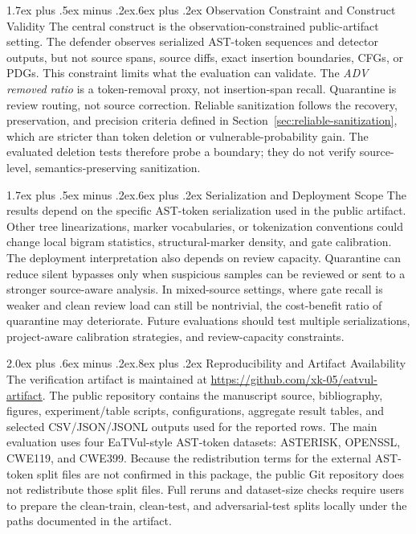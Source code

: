 \documentclass[letterpaper,twocolumn,10pt,twoside]{article}
\makeatletter
\renewcommand\section{\@startsection{section}{1}{\z@}%
  {2.0ex plus .6ex minus .2ex}{.8ex plus .2ex}%
  {\normalfont\large\bfseries}}
\renewcommand\subsection{\@startsection{subsection}{2}{\z@}%
  {1.7ex plus .5ex minus .2ex}{.6ex plus .2ex}%
  {\normalfont\normalsize\bfseries}}
\newcommand{\dataset}[1]{\textsc{#1}}
\makeatother
\begin{document}
\subsection{Observation Constraint and Construct Validity}
The central construct is the observation-constrained public-artifact setting. The defender observes serialized AST-token sequences and detector outputs, but not source spans, source diffs, exact insertion boundaries, CFGs, or PDGs. This constraint limits what the evaluation can validate. The \textit{ADV removed ratio} is a token-removal proxy, not insertion-span recall. Quarantine is review routing, not source correction. Reliable sanitization follows the recovery, preservation, and precision criteria defined in Section~\ref{sec:reliable-sanitization}, which are stricter than token deletion or vulnerable-probability gain. The evaluated deletion tests therefore probe a boundary; they do not verify source-level, semantics-preserving sanitization.

\subsection{Serialization and Deployment Scope}
The results depend on the specific AST-token serialization used in the public artifact. Other tree linearizations, marker vocabularies, or tokenization conventions could change local bigram statistics, structural-marker density, and gate calibration. The deployment interpretation also depends on review capacity. Quarantine can reduce silent bypasses only when suspicious samples can be reviewed or sent to a stronger source-aware analysis. In mixed-source settings, where gate recall is weaker and clean review load can still be nontrivial, the cost-benefit ratio of quarantine may deteriorate. Future evaluations should test multiple serializations, project-aware calibration strategies, and review-capacity constraints.

\section{Reproducibility and Artifact Availability}
The verification artifact is maintained at \url{https://github.com/xk-05/eatvul-artifact}. The public repository contains the manuscript source, bibliography, figures, experiment/table scripts, configurations, aggregate result tables, and selected CSV/JSON/JSONL outputs used for the reported rows. The main evaluation uses four EaTVul-style AST-token datasets: \dataset{ASTERISK}, \dataset{OPENSSL}, \dataset{CWE119}, and \dataset{CWE399}. Because the redistribution terms for the external AST-token split files are not confirmed in this package, the public Git repository does not redistribute those split files. Full reruns and dataset-size checks require users to prepare the clean-train, clean-test, and adversarial-test splits locally under the paths documented in the artifact.
\end{document}
